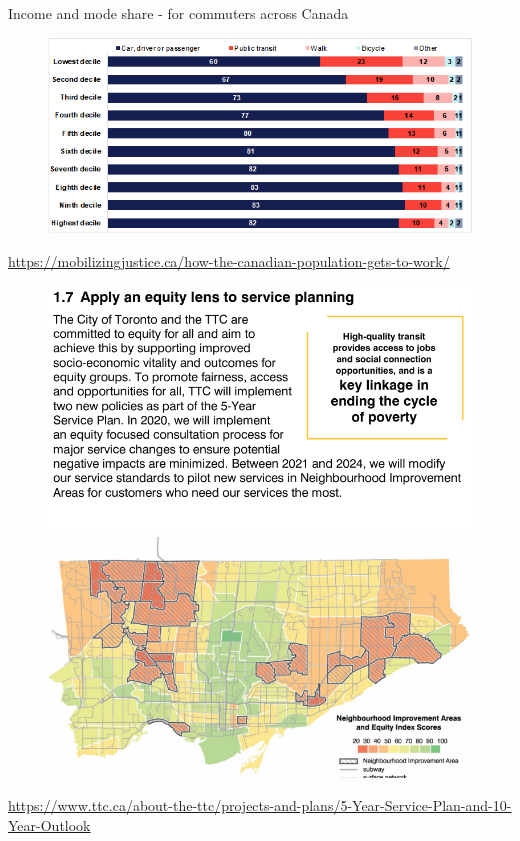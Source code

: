 \documentclass[aspectratio=169]{beamer}
\begin{document}
\begin{frame}
	
	Income and mode share - for commuters across Canada
	
	\begin{figure}
		\centering
		\includegraphics[width=0.94\linewidth]{images/income_mode_canada.png}
	\end{figure}
	
	\tiny\url{https://mobilizingjustice.ca/how-the-canadian-population-gets-to-work/}
	
\end{frame}





\begin{frame}
	
	\begin{figure}
		\centering
		\includegraphics[width=0.5\linewidth]{images/ttc_equity.png}
	\end{figure}
	
	\tiny\url{https://www.ttc.ca/about-the-ttc/projects-and-plans/5-Year-Service-Plan-and-10-Year-Outlook}
	
\end{frame}
\end{document}
